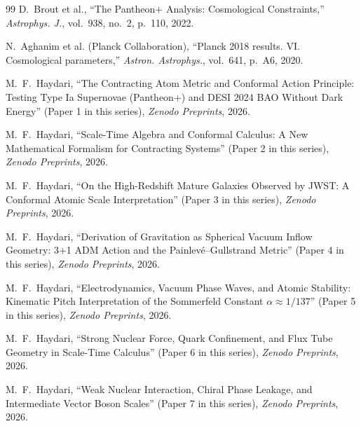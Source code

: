 \documentclass[11pt,a4paper]{article}
\begin{document}
\begin{thebibliography}{99}
    D.~Brout et al., ``The Pantheon+ Analysis: Cosmological Constraints,'' \textit{Astrophys. J.}, vol.~938, no.~2, p.~110, 2022.

    N.~Aghanim et al. (Planck Collaboration), ``Planck 2018 results. VI. Cosmological parameters,'' \textit{Astron. Astrophys.}, vol.~641, p.~A6, 2020.

    M.~F.~Haydari, ``The Contracting Atom Metric and Conformal Action Principle: Testing Type Ia Supernovae (Pantheon+) and DESI 2024 BAO Without Dark Energy'' (Paper 1 in this series), \textit{Zenodo Preprints}, 2026.

    M.~F.~Haydari, ``Scale-Time Algebra and Conformal Calculus: A New Mathematical Formalism for Contracting Systems'' (Paper 2 in this series), \textit{Zenodo Preprints}, 2026.

    M.~F.~Haydari, ``On the High-Redshift Mature Galaxies Observed by JWST: A Conformal Atomic Scale Interpretation'' (Paper 3 in this series), \textit{Zenodo Preprints}, 2026.

    M.~F.~Haydari, ``Derivation of Gravitation as Spherical Vacuum Inflow Geometry: 3+1 ADM Action and the Painlevé--Gullstrand Metric'' (Paper 4 in this series), \textit{Zenodo Preprints}, 2026.

    M.~F.~Haydari, ``Electrodynamics, Vacuum Phase Waves, and Atomic Stability: Kinematic Pitch Interpretation of the Sommerfeld Constant $\alpha \approx 1/137$'' (Paper 5 in this series), \textit{Zenodo Preprints}, 2026.

    M.~F.~Haydari, ``Strong Nuclear Force, Quark Confinement, and Flux Tube Geometry in Scale-Time Calculus'' (Paper 6 in this series), \textit{Zenodo Preprints}, 2026.

    M.~F.~Haydari, ``Weak Nuclear Interaction, Chiral Phase Leakage, and Intermediate Vector Boson Scales'' (Paper 7 in this series), \textit{Zenodo Preprints}, 2026.
\end{thebibliography}
\end{document}
